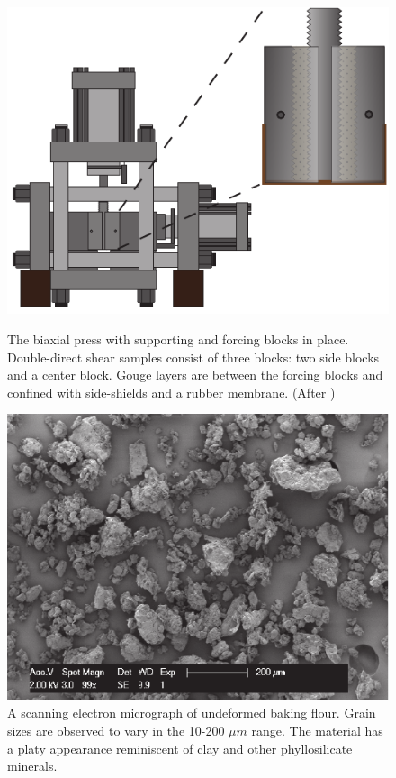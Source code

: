 \begin{figure}[t!]
\begin{centering}
\includegraphics{chap_granular_stiffness/Fig2.pdf}
\label{fig:biax}
\caption{The biaxial press with supporting and forcing blocks in place.  Double-direct shear samples consist of three blocks: two side blocks and a center block.  Gouge layers are between the forcing blocks and confined with side-shields and a rubber membrane. (After \cite{Leeman_2014})}
\end{centering}
\end{figure}

\clearpage

\begin{figure}[t!]
\begin{centering}
\includegraphics{chap_granular_stiffness/Fig3.pdf}
\caption{\label{fig:flour_sem}
A scanning electron micrograph of undeformed baking flour.  Grain sizes are observed to vary in the 10-200 $\mu m$ range.  The material has a platy appearance reminiscent of clay and other phyllosilicate minerals.}
\end{centering}
\end{figure}

